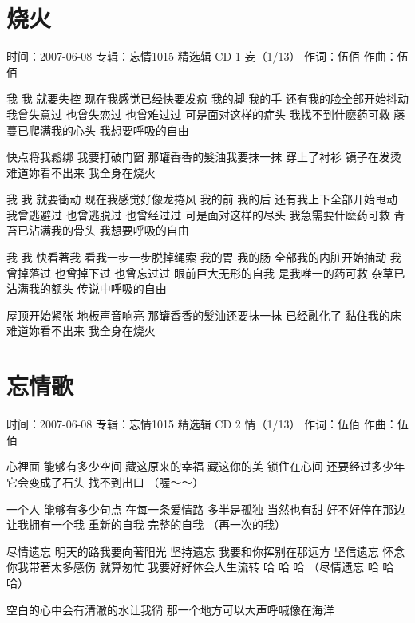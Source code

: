 \documentclass[UTF8,a4paper,oneside,twocolumn,12pt]{ctexbook}
\newcommand{\infopair}[2]{\textbullet #1：#2}
\newcommand{\zc}[1][伍佰]{\infopair{作词}{#1}}
\newcommand{\zq}[1][伍佰]{\infopair{作曲}{#1}}
\newcommand{\zj}[1]{\infopair{专辑}{#1}}
\newcommand{\sj}[1]{\infopair{时间}{#1}}
\newenvironment{info}{\begin{flushleft}\kaishu
	}
	{\end{flushleft}\normalsize\yahei\par}
\newenvironment{lyric}{
	}
{}
\begin{document}
\section{烧火}
\begin{info}
	\sj{2007-06-08}
	\zj{忘情1015 精选辑 CD 1 妄（1/13）}
	\zc
	\zq
\end{info}
\begin{lyric}
	我 我 就要失控 现在我感觉已经快要发疯
	我的脚 我的手 还有我的脸全部开始抖动
	我曾失意过 也曾失恋过 也曾难过过
	可是面对这样的症头 我找不到什麽药可救
	藤蔓已爬满我的心头 我想要呼吸的自由

	快点将我鬆绑 我要打破门窗 那罐香香的髮油我要抹一抹
	穿上了衬衫 镜子在发烫 难道妳看不出来 我全身在烧火

	我 我 就要衝动 现在我感觉好像龙捲风
	我的前 我的后 还有我上下全部开始甩动
	我曾逃避过 也曾逃脱过 也曾经过过
	可是面对这样的尽头 我急需要什麽药可救
	青苔已沾满我的骨头 我想要呼吸的自由

	我 我 快看著我 看我一步一步脱掉绳索
	我的胃 我的肠 全部我的内脏开始抽动
	我曾掉落过 也曾掉下过 也曾忘过过
	眼前巨大无形的自我 是我唯一的药可救
	杂草已沾满我的额头 传说中呼吸的自由

	屋顶开始紧张 地板声音响亮 那罐香香的髮油还要抹一抹
	已经融化了 黏住我的床 难道妳看不出来 我全身在烧火
\end{lyric}

\section{忘情歌}
\begin{info}
	\sj{2007-06-08}
	\zj{忘情1015 精选辑 CD 2 情（1/13）}
	\zc
	\zq
\end{info}
\begin{lyric}
	心裡面 能够有多少空间
	藏这原来的幸福 藏这你的美
	锁住在心间 还要经过多少年
	它会变成了石头 找不到出口
	（喔～～）

	一个人 能够有多少句点
	在每一条爱情路 多半是孤独
	当然也有甜 好不好停在那边
	让我拥有一个我 重新的自我
	完整的自我 （再一次的我）

	尽情遗忘 明天的路我要向著阳光
	坚持遗忘 我要和你挥别在那远方
	坚信遗忘 怀念你我带著太多感伤
	就算匆忙 我要好好体会人生流转
	哈 哈 哈 （尽情遗忘 哈 哈 哈）

	空白的心中会有清澈的水让我徜
	那一个地方可以大声呼喊像在海洋
\end{lyric}
\end{document}
